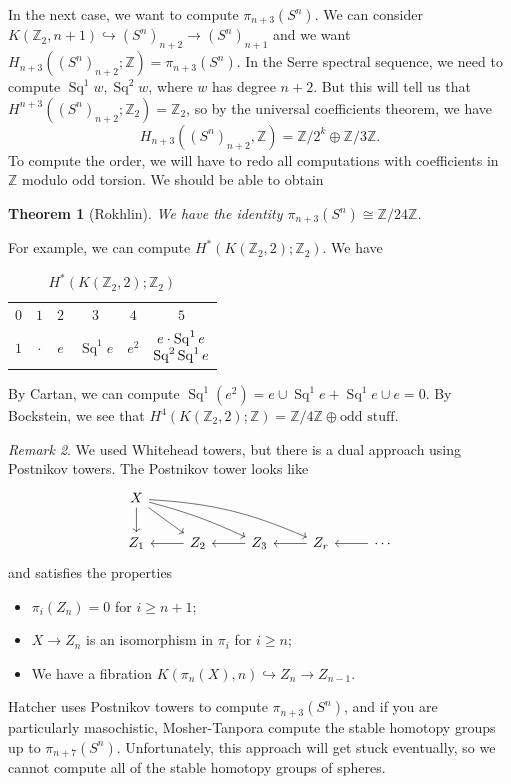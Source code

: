 \documentclass[leqno, openany]{memoir}
\newtheorem{thm}{Theorem}[section]
\theoremstyle{definition}
\theoremstyle{remark}
\newtheorem{rmk}[thm]{Remark}
\theoremstyle{plain}
\theoremstyle{definition}
\theoremstyle{remark}
\newcommand{\Z}{\mathbb{Z}}
\DeclareMathOperator{\Sq}{Sq}
\begin{document}
In the next case, we want to compute $\pi_{n+3}(S^n)$. We can consider $K(\Z_2, n+1) \hookrightarrow {(S^n)}_{n+2} \to {(S^n)}_{n+1}$ and we want $H_{n+3}({(S^n)}_{n+2}; \Z) = \pi_{n+3}(S^n)$. In the Serre spectral sequence, we need to compute $\Sq^1 w, \Sq^2 w$, where $w$ has degree $n+2$. But this will tell us that $H^{n+3}({(S^n)}_{n+2}; \Z_2) = \Z_2$, so by the universal coefficients theorem, we have
\[ H_{n+3}({(S^n)}_{n+2}, \Z) = \Z/2^k \oplus \Z/3\Z. \]
To compute the order, we will have to redo all computations with coefficients in $\Z$ modulo odd torsion. We should be able to obtain
\begin{thm}[Rokhlin]
    We have the identity $\pi_{n+3}(S^n) \cong \Z/24 \Z$.
\end{thm}
For example, we can compute $H^*(K(\Z_2, 2); \Z_2)$. We have
\begin{table}[H]
    \centering
    \caption{$H^*(K(\Z_2, 2); \Z_2)$}
    \label{tab:label}
    \begin{tabular}{cccccc}
    \toprule
    $0$ & $1$ & $2$ & $3$ & $4$ & $5$ \\
    $1$ & $\cdot$ & $e$ & $\Sq^1 e$ & $e^2$ & $\Vectorstack{{e \cdot \Sq^1 e} {\Sq^2 \Sq^1 e}}$ \\
    \bottomrule
    \end{tabular}
\end{table}
By Cartan, we can compute $\Sq^1(e^2) = e \cup \Sq^1 e + \Sq^1 e \cup e = 0$. By Bockstein, we see that $H^4(K(\Z_2, 2); \Z) = \Z/4\Z \oplus \text{odd stuff}$.

\begin{rmk}
    We used Whitehead towers, but there is a dual approach using Postnikov towers. The Postnikov tower looks like
    \begin{equation*}
    \begin{tikzcd}
        X \ar{d} \ar{dr} \ar[bend left=5]{drr} \ar[bend left=10]{drrr} \\
        Z_1 & Z_2 \ar{l} & Z_3 \ar{l} & Z_r \ar{l} & \cdots \ar{l}
    \end{tikzcd}
    \end{equation*}
    and satisfies the properties
    \begin{itemize}
        \item $\pi_i(Z_n) = 0$ for $i \geq n+1$;
        \item $X \to Z_n$ is an isomorphism in $\pi_i$ for $i \geq n$;
        \item We have a fibration $K(\pi_n(X), n) \hookrightarrow Z_n \to Z_{n-1}$.
    \end{itemize}
\end{rmk}
Hatcher uses Postnikov towers to compute $\pi_{n+3}(S^n)$, and if you are particularly masochistic, Mosher-Tanpora compute the stable homotopy groups up to $\pi_{n+7}(S^n)$. Unfortunately, this approach will get stuck eventually, so we cannot compute all of the stable homotopy groups of spheres.
\end{document}
